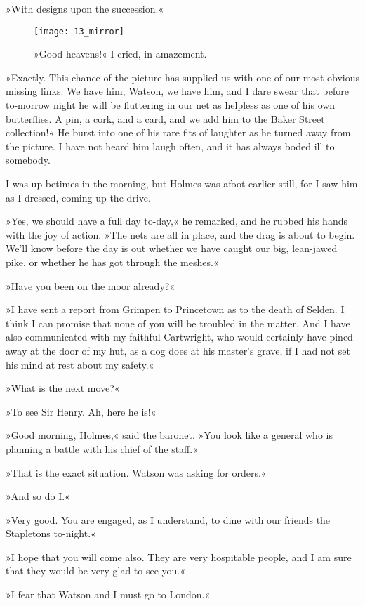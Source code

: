 »With designs upon the succession.«

\begin{figure}[tbh]
\centering
\texttt{[image: 13\_mirror]}
\caption{»Good heavens!« I cried, in amazement.}
\end{figure}

»Exactly. This chance of the picture has supplied us with one of our most obvious missing links. We have him, Watson, we have him, and I dare swear that before to-morrow night he will be fluttering in our net as helpless as one of his own butterflies. A pin, a cork, and a card, and we add him to the Baker Street collection!« He burst into one of his rare fits of laughter as he turned away from the picture. I have not heard him laugh often, and it has always boded ill to somebody.

I was up betimes in the morning, but Holmes was afoot earlier still, for I saw him as I dressed, coming up the drive.

»Yes, we should have a full day to-day,« he remarked, and he rubbed his hands with the joy of action. »The nets are all in place, and the drag is about to begin. We'll know before the day is out whether we have caught our big, lean-jawed pike, or whether he has got through the meshes.«

»Have you been on the moor already?«

»I have sent a report from Grimpen to Princetown as to the death of Selden. I think I can promise that none of you will be troubled in the matter. And I have also communicated with my faithful Cartwright, who would certainly have pined away at the door of my hut, as a dog does at his master's grave, if I had not set his mind at rest about my safety.«

»What is the next move?«

»To see Sir Henry. Ah, here he is!«

»Good morning, Holmes,« said the baronet. »You look like a general who is planning a battle with his chief of the staff.«

»That is the exact situation. Watson was asking for orders.«

»And so do I.«

»Very good. You are engaged, as I understand, to dine with our friends the Stapletons to-night.«

»I hope that you will come also. They are very hospitable people, and I am sure that they would be very glad to see you.«

»I fear that Watson and I must go to London.«


